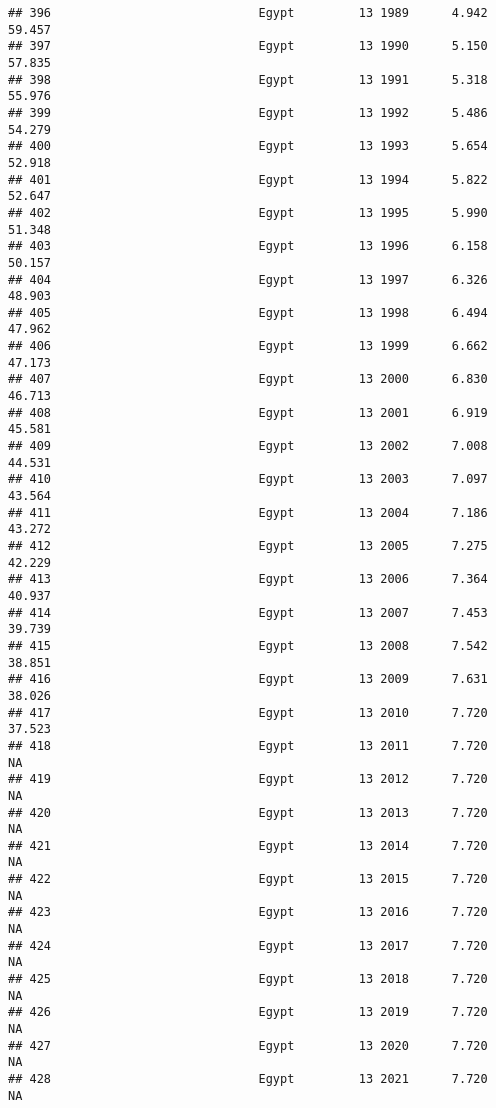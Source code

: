 \documentclass[
]{article}
\begin{document}
\begin{verbatim}
## 396                             Egypt         13 1989      4.942     59.457
## 397                             Egypt         13 1990      5.150     57.835
## 398                             Egypt         13 1991      5.318     55.976
## 399                             Egypt         13 1992      5.486     54.279
## 400                             Egypt         13 1993      5.654     52.918
## 401                             Egypt         13 1994      5.822     52.647
## 402                             Egypt         13 1995      5.990     51.348
## 403                             Egypt         13 1996      6.158     50.157
## 404                             Egypt         13 1997      6.326     48.903
## 405                             Egypt         13 1998      6.494     47.962
## 406                             Egypt         13 1999      6.662     47.173
## 407                             Egypt         13 2000      6.830     46.713
## 408                             Egypt         13 2001      6.919     45.581
## 409                             Egypt         13 2002      7.008     44.531
## 410                             Egypt         13 2003      7.097     43.564
## 411                             Egypt         13 2004      7.186     43.272
## 412                             Egypt         13 2005      7.275     42.229
## 413                             Egypt         13 2006      7.364     40.937
## 414                             Egypt         13 2007      7.453     39.739
## 415                             Egypt         13 2008      7.542     38.851
## 416                             Egypt         13 2009      7.631     38.026
## 417                             Egypt         13 2010      7.720     37.523
## 418                             Egypt         13 2011      7.720         NA
## 419                             Egypt         13 2012      7.720         NA
## 420                             Egypt         13 2013      7.720         NA
## 421                             Egypt         13 2014      7.720         NA
## 422                             Egypt         13 2015      7.720         NA
## 423                             Egypt         13 2016      7.720         NA
## 424                             Egypt         13 2017      7.720         NA
## 425                             Egypt         13 2018      7.720         NA
## 426                             Egypt         13 2019      7.720         NA
## 427                             Egypt         13 2020      7.720         NA
## 428                             Egypt         13 2021      7.720         NA

\end{verbatim}
\end{document}
